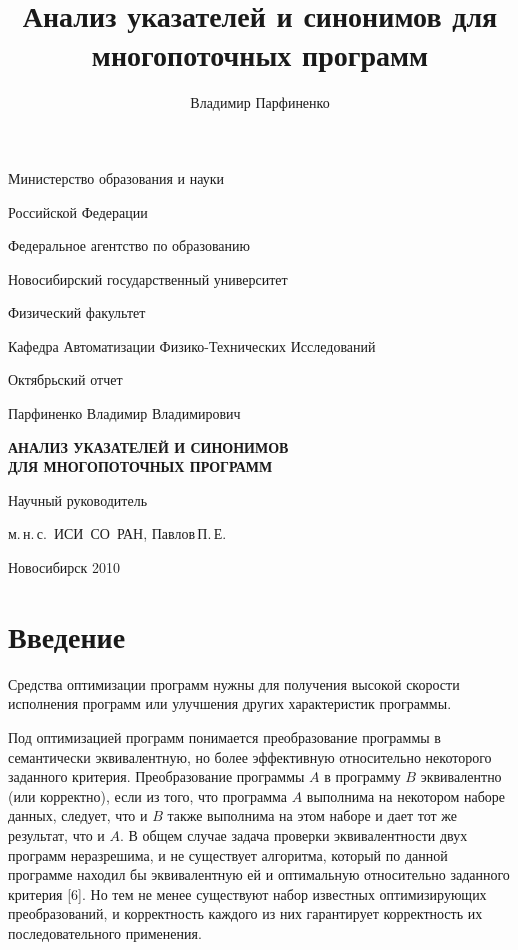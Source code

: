 \documentclass[a4,14pt,titlepage]{extarticle}
\title{
  Анализ указателей и синонимов для многопоточных программ
}
\author{
  Владимир Парфиненко
}
\begin{document}
  \thispagestyle{empty}
  \begin {center}
    Министерство образования и науки

    Российской Федерации

    Федеральное агентство по образованию

    \vspace{0.3cm}

    Новосибирский государственный университет

    \vspace{0.3cm}

    Физический факультет

    Кафедра Автоматизации Физико-Технических Исследований

    \vspace {40mm}

    Октябрьский отчет

    \vspace {10mm}

    Парфиненко Владимир Владимирович

    \vspace {5mm}

    \textbf{АНАЛИЗ УКАЗАТЕЛЕЙ И СИНОНИМОВ\\ ДЛЯ МНОГОПОТОЧНЫХ ПРОГРАММ}

    \vspace {20mm}

    {\raggedleft

    Научный руководитель

    м.\,н.\,с.~ИСИ~СО~РАН, Павлов\,П.\,Е.

    \vspace {50mm}

    Новосибирск 2010}
  \end {center}


  \tableofcontents

  \newpage
  \section{Введение}

    Средства оптимизации программ нужны для получения высокой
    скорости исполнения программ или улучшения других характеристик программы.

    Под оптимизацией программ понимается преобразование программы в
    семантически эквивалентную, но более эффективную относительно некоторого
    заданного критерия.
    Преобразование программы $A$ в программу $B$ эквивалентно (или корректно),
    если из того, что программа $A$ выполнима на некотором наборе данных,
    следует, что и $B$ также выполнима на этом наборе и дает тот же результат,
    что и $A$.
    В общем случае задача проверки эквивалентности двух программ неразрешима,
    и не существует алгоритма, который по данной программе находил бы
    эквивалентную ей и оптимальную относительно заданного критерия [6].
    Но тем не менее существуют набор известных оптимизирующих преобразований,
    и корректность каждого из них гарантирует корректность их последовательного
    применения.
\end{document}
